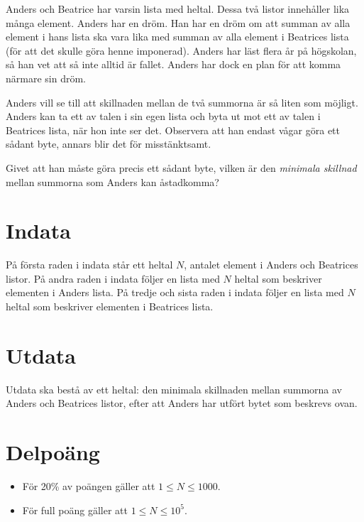 
Anders och Beatrice har varsin lista med heltal. Dessa två listor innehåller lika många element. Anders har en dröm. Han har en dröm om att summan av alla element i hans lista ska vara lika med summan av alla element i Beatrices lista (för att det skulle göra henne imponerad). Anders har läst flera år på högskolan, så han vet att så inte alltid är fallet. Anders har dock en plan för att komma närmare sin dröm.

Anders vill se till att skillnaden mellan de två summorna är så liten som möjligt. Anders kan ta ett av talen i sin egen lista och byta ut mot ett av talen i Beatrices lista, när hon inte ser det. Observera att han endast vågar göra ett sådant byte, annars blir det för misstänktsamt.

Givet att han måste göra precis ett sådant byte, vilken är den \emph{minimala skillnad} mellan summorna som Anders kan åstadkomma?

\section*{Indata}
På första raden i indata står ett heltal $N$, antalet element i Anders och Beatrices listor. På andra raden i indata följer en lista med $N$ heltal som beskriver elementen i Anders lista. På tredje och sista raden i indata följer en lista med $N$ heltal som beskriver elementen i Beatrices lista.

\section*{Utdata}
Utdata ska bestå av ett heltal: den minimala skillnaden mellan summorna av Anders och Beatrices listor, efter att Anders har utfört bytet som beskrevs ovan.

\section*{Delpoäng}
\begin{itemize}
\item För 20\% av poängen gäller att $1 \leq N \leq 1000$.
\item För full poäng gäller att $1 \leq N \leq 10^{5}$.
\end{itemize}
